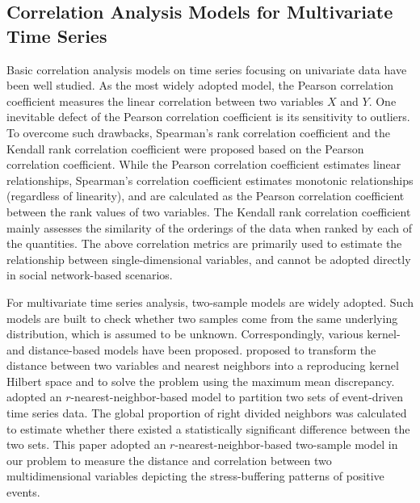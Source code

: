 \documentclass[5p,times,numbers,authoryear]{elsarticle}
\begin{document}
\subsection{Correlation Analysis Models for Multivariate Time Series}
Basic correlation analysis models on time series focusing on univariate data have been well studied.
As the most widely adopted model, the Pearson correlation coefficient \cite{Cohen1988Statistical} measures the linear correlation between two variables $X$ and $Y$.
One inevitable defect of the Pearson correlation coefficient is its sensitivity to outliers.
To overcome such drawbacks, Spearman's rank correlation coefficient \cite{C1987The} and the Kendall rank correlation coefficient \cite{Mcleod2011Kendall} were proposed based on the Pearson correlation coefficient.
While the Pearson correlation coefficient estimates linear relationships,
Spearman's correlation coefficient estimates monotonic relationships (regardless of linearity),
and are calculated as the Pearson correlation coefficient between the rank values of two variables.
The Kendall rank correlation coefficient mainly assesses the similarity of the orderings of the data when ranked by each of the quantities.
The above correlation metrics are primarily used to estimate the relationship between single-dimensional variables, and cannot be adopted directly in social network-based scenarios.

For multivariate time series analysis, two-sample models are widely adopted.
Such models are built to check whether two samples come from the same underlying distribution,
which is assumed to be unknown.
Correspondingly, various kernel- \citep{Sch2006A} and distance-based models \citep{Schilling1986Multivariate} have been proposed.
\citep{Sch2006A} proposed to transform the distance between two variables and nearest neighbors into a reproducing kernel Hilbert space and to solve the problem using the maximum mean discrepancy.
\citep{Schilling1986Multivariate} adopted an $r$-nearest-neighbor-based model to partition two sets of event-driven time series data.
The global proportion of 
{right divided neighbors} 
was calculated to estimate whether there existed a statistically significant difference between the two sets.
This paper adopted an $r$-nearest-neighbor-based two-sample model in our problem to measure the distance and correlation between two multidimensional variables depicting
the stress-buffering patterns of positive events.
\end{document}
